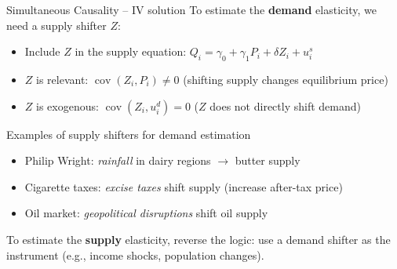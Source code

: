 \documentclass[10pt]{beamer}
\begin{document}
\begin{frame}{Simultaneous Causality -- IV solution}
\label{slide:simul_iv}
To estimate the \textbf{demand} elasticity, we need a \alert{supply shifter} $Z$:
\begin{itemize}
  \item Include $Z$ in the supply equation: $Q_i = \gamma_0 + \gamma_1 P_i + \delta Z_i + u_i^s$
  \item $Z$ is relevant: $\operatorname{cov}(Z_i, P_i) \neq 0$ (shifting supply changes equilibrium price)
  \item $Z$ is exogenous: $\operatorname{cov}(Z_i, u_i^d) = 0$ ($Z$ does not directly shift demand)
\end{itemize}

\pause
\vspace{0.5em}
\begin{exampleblock}{Examples of supply shifters for demand estimation}
\begin{itemize}
  \item Philip Wright: \emph{rainfall} in dairy regions $\to$ butter supply
  \item Cigarette taxes: \emph{excise taxes} shift supply (increase after-tax price)
  \item Oil market: \emph{geopolitical disruptions} shift oil supply
\end{itemize}
\end{exampleblock}

\pause
\vspace{0.3em}
To estimate the \textbf{supply} elasticity, reverse the logic: use a \alert{demand shifter} as the instrument (e.g., income shocks, population changes).
\end{frame}
\end{document}
